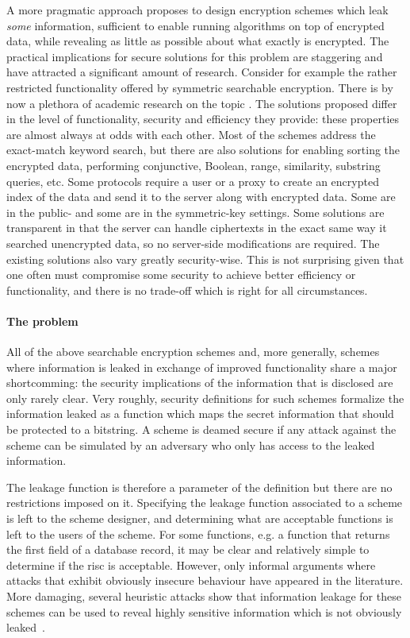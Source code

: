 A more pragmatic approach proposes to design encryption schemes which leak \emph{some} information, sufficient to enable running algorithms on top of encrypted data, while revealing as little as possible about what exactly is encrypted. 
The practical implications for secure solutions for this problem are staggering and have attracted a significant amount of research.
Consider for example  the rather restricted functionality offered by symmetric searchable encryption.
There is by now a plethora of academic research on the topic \cite{}. 
The solutions proposed differ in the level of functionality, security and efficiency they provide: 
these properties are almost always at odds with each other. 
Most of the schemes address the exact-match keyword search, but there are also solutions for enabling
sorting the encrypted data, performing conjunctive, Boolean, range, similarity, substring queries, etc. Some
protocols require a user or a proxy to create an encrypted index of the data and send it to the server along
with encrypted data. Some are in the public- and some are in the symmetric-key settings. Some solutions
are transparent in that the server can handle ciphertexts in the exact same way it searched unencrypted data,
so no server-side modifications are required. The existing solutions also vary greatly security-wise. This
is not surprising given that one often must compromise some security to achieve better efficiency or
functionality, and there is no trade-off which is right for all circumstances. 

\paragraph{The problem}
All of the above searchable encryption schemes and, more generally, schemes where information is leaked in exchange of improved functionality share a major shortcomming: the security implications of the information that is disclosed are only rarely clear. 
Very roughly, security definitions for such schemes formalize the information leaked as  a function which maps the secret information that should be protected to a bitstring.  A scheme is deamed secure if any attack against the scheme can be simulated by an adversary who only has access to the leaked information.

The leakage function is therefore a parameter of the definition but there are no restrictions imposed on it. 
Specifying the leakage function associated to a scheme is left to the scheme designer, and determining what are acceptable functions is left to the users of the scheme.
For some functions, e.g. a function that returns the first field of a database record, it may be clear and relatively simple to determine if the risc is acceptable.  However, only informal arguments where attacks that exhibit obviously insecure behaviour have appeared in the literature. 
More damaging, several heuristic attacks show that information leakage for these schemes can be used to reveal highly sensitive information which is not obviously leaked~\cite{cash2015leakage}. 

